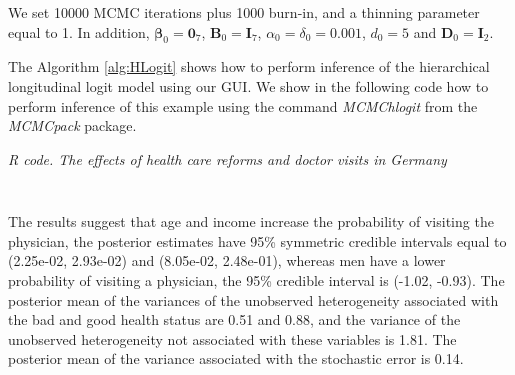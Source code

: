 We set 10000 MCMC iterations plus 1000 burn-in, and a thinning parameter equal to 1. In addition, $\bm{\beta}_0=\bm{0}_7$, $\bm{B}_0=\bm{I}_7$, $\alpha_0=\delta_0=0.001$, $d_0=5$ and $\bm{D}_0=\bm{I}_2$. 

The Algorithm \ref{alg:HLogit} shows how to perform inference of the hierarchical longitudinal logit model using our GUI. We show in the following code how to perform inference of this example using the command \textit{MCMChlogit} from the \textit{MCMCpack} package.


\begin{tcolorbox}[enhanced,width=4.67in,center upper,
	fontupper=\large\bfseries,drop shadow southwest,sharp corners]
	\textit{R code. The effects of health care reforms and doctor visits in Germany}
	\begin{VF}
		\begin{lstlisting}[language=R]
			
		\end{lstlisting}
	\end{VF}
\end{tcolorbox}

The results suggest that age and income increase the probability of visiting the physician, the posterior estimates have 95\% symmetric credible intervals equal to (2.25e-02, 2.93e-02) and (8.05e-02, 2.48e-01), whereas men have a lower probability of visiting a physician, the 95\% credible interval is (-1.02, -0.93).
The posterior mean of the variances of the unobserved heterogeneity associated with the bad and good health status are 0.51 and 0.88, and the variance of the unobserved heterogeneity not associated with these variables is 1.81. The posterior mean of the variance associated with the stochastic error is 0.14.\\

